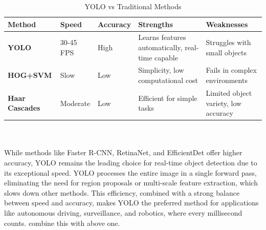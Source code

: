 \begin{table}[ht]
\centering
\caption{YOLO vs Traditional Methods}
\vspace{0.3cm} 
\begin{tabular}{|l|l|l|p{4.5cm}|p{4.5cm}|}
\hline
\textbf{Method}       & \textbf{Speed} & \textbf{Accuracy} & \textbf{Strengths}                                 & \textbf{Weaknesses}                               \\ \hline
\textbf{YOLO}         & 30-45 FPS      & High             & Learns features automatically, real-time capable  & Struggles with small objects                     \\ \hline
\textbf{HOG+SVM}      & Slow           & Low              & Simplicity, low computational cost                & Fails in complex environments                    \\ \hline
\textbf{Haar Cascades} & Moderate       & Low              & Efficient for simple tasks                        & Limited object variety, low accuracy             \\ \hline
\end{tabular}
\label{tab:yolo_vs_traditional}
\end{table}
\\\\
%
%
While methods like Faster R-CNN, RetinaNet, and EfficientDet offer higher accuracy, YOLO remains the leading choice for real-time object detection due to its exceptional speed. YOLO processes the entire image in a single forward pass, eliminating the need for region proposals or multi-scale feature extraction, which slows down other methods. This efficiency, combined with a strong balance between speed and accuracy, makes YOLO the preferred method for applications like autonomous driving, surveillance, and robotics, where every millisecond counts. combine this with above one.
%
